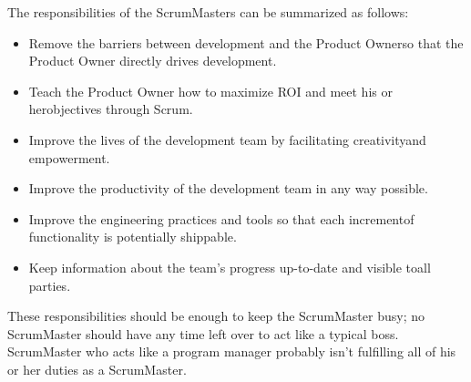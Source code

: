 The responsibilities of the ScrumMasters can be summarized as follows:
\begin{itemize}
  \item Remove the barriers between development and the Product Ownerso that the Product Owner directly drives development.
  \item Teach the Product Owner how to maximize ROI and meet his or herobjectives through Scrum.
  \item Improve the lives of the development team by facilitating creativityand empowerment.
  \item Improve the productivity of the development team in any way possible.
  \item Improve the engineering practices and tools so that each incrementof functionality is potentially shippable.
  \item Keep information about the team’s progress up-to-date and visible toall parties.
\end{itemize}

These responsibilities should be enough to keep the ScrumMaster busy; no ScrumMaster should have any time left over to act like a typical boss. ScrumMaster who acts like a program manager probably isn’t fulfilling all of his or her  duties as a ScrumMaster.




